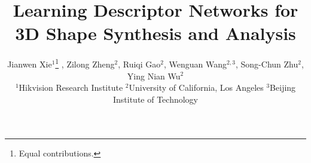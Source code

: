 \documentclass[10pt,twocolumn,letterpaper]{article}
\begin{document}
\title{Learning Descriptor Networks for 3D Shape Synthesis and Analysis}

\newcommand*\samethanks[1][\value{footnote}]{\footnotemark[#1]}

\author{Jianwen Xie$^{1}$\thanks{Equal contributions.} , Zilong Zheng$^{2}$\samethanks[1] , Ruiqi Gao$^{2}$, Wenguan Wang$^{2,3}$, Song-Chun Zhu$^{2}$, Ying Nian Wu$^{2}$\\
$^{1}$Hikvision Research Institute 
$^{2}$University of California, Los Angeles 
$^{3}$Beijing Institute of Technology\\
}


\end{document}
